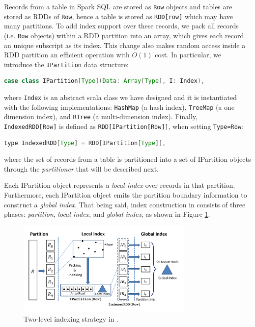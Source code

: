  Records from a table in Spark SQL are stored
as \texttt{Row} objects and tables are stored as RDDs of \texttt{Row},
hence a table is stored as \texttt{RDD[row]} which may have many
partitions. To add index support over these records, we pack all
records (i.e. \texttt{Row} objects) within a RDD partition into an
array, which gives each record an unique subscript as its index. This
change also makes random access inside a RDD partition an efficient
operation with $O(1)$ cost. In particular, we introduce the
\texttt{IPartition} data structure:

\begin{lstlisting}[language=java]
case class IPartition[Type](Data: Array[Type], I: Index),
\end{lstlisting}\vspace{-1mm}
where \texttt{Index} is an abstract scala class we have designed and
it is instantiated with the following implementations:
\texttt{HashMap} (a hash index), \texttt{TreeMap} (a one dimension
index), and \texttt{RTree} (a multi-dimension index). Finally,
\texttt{IndexedRDD[Row]} is defined as \texttt{RDD[IPartition[Row]]},
when setting \texttt{Type=Row}:
\begin{lstlisting}[language=java]
type IndexedRDD[Type] = RDD[IPartition[Type]],
\end{lstlisting}\vspace{-1mm}
where the set of records from a table is partitioned into a set of
IPartition objects through the {\em partitioner} that will be
described next.

Each IPartition object represents a {\em local index} over records in
that partition. Furthermore, each IPartition object emits the
partition boundary information to construct a {\em global index}. That
being said, index construction in \name consists of three phases:
\emph{partition}, \emph{local index}, and \emph{global index}, as
shown in Figure \ref{fig:index}.

\begin{figure}[t!]
	\centering
	\includegraphics[width=3.4in]{figs/index}
	\vspace{-8mm}
	\caption{Two-level indexing strategy in \name.}
	\label{fig:index}
    \vspace{-4mm}
\end{figure}


